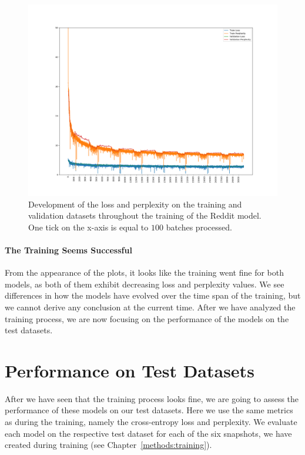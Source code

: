 \begin{figure}[H]
	\includegraphics[width=\linewidth]{img/plots/reddit/train_metrics.png}
	\caption{Development of the loss and perplexity on the training and validation datasets throughout the training of the Reddit model. One tick on the x-axis is equal to $100$ batches processed.}
	\label{results:learning_process:metrics:reddit}
\end{figure}

\paragraph{The Training Seems Successful} From the appearance of the plots, it looks like the training went fine for both models, as both of them exhibit decreasing loss and perplexity values. We see differences in how the models have evolved over the time span of the training, but we cannot derive any conclusion at the current time. After we have analyzed the training process, we are now focusing on the performance of the models on the test datasets.

\section{Performance on Test Datasets}
\label{results:performance_on_test_datasets}
After we have seen that the training process looks fine, we are going to assess the performance of these models on our test datasets. Here we use the same metrics as during the training, namely the cross-entropy loss and perplexity. We evaluate each model on the respective test dataset for each of the six snapshots, we have created during training (see Chapter~\ref{methods:training}).

